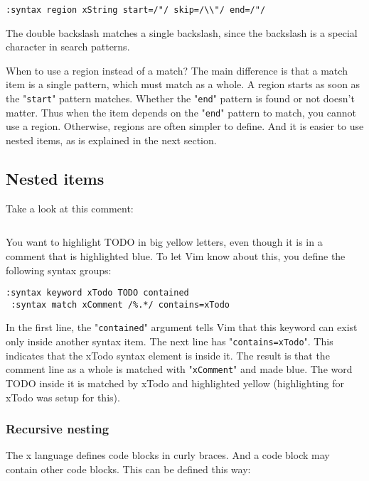 \begin{Verbatim}[samepage=true]
 :syntax region xString start=/"/ skip=/\\"/ end=/"/
\end{Verbatim}

The double backslash matches a single backslash, since the backslash is a special character in search patterns.

When to use a region instead of a match?
The main difference is that a match item is a single pattern, which must match as a whole.
A region starts as soon as the "\verb!start!" pattern matches.
Whether the "\verb!end!" pattern is found or not doesn't matter.
Thus when the item depends on the "\verb!end!" pattern to match, you cannot use a region.
Otherwise, regions are often simpler to define.
And it is easier to use nested items, as is explained in the next section.
\subsection{Nested items}
Take a look at this comment:

\begin{Verbatim}[samepage=true]
    %Get input  TODO: Skip white space 
\end{Verbatim}

You want to highlight TODO in big yellow letters, even though it is in a comment that is highlighted blue.
To let Vim know about this, you define the following syntax groups:

\begin{Verbatim}[samepage=true]
 :syntax keyword xTodo TODO contained
 :syntax match xComment /%.*/ contains=xTodo
\end{Verbatim}

In the first line, the "\verb!contained!" argument tells Vim that this keyword can exist only inside another syntax item.
The next line has "\verb!contains=xTodo!".
This indicates that the xTodo syntax element is inside it.
The result is that the comment line as a whole is matched with "\verb!xComment!" and made blue.
The word TODO inside it is matched by xTodo and highlighted yellow (highlighting for xTodo was setup for this).

\subsubsection{Recursive nesting}
The x language defines code blocks in curly braces.
And a code block may contain other code blocks.
This can be defined this way:

